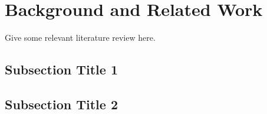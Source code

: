\section{Background and Related Work}\label{sec:survey} 
Give some relevant literature review here. 
\subsection{Subsection Title 1}
\subsection{Subsection Title 2}




 




